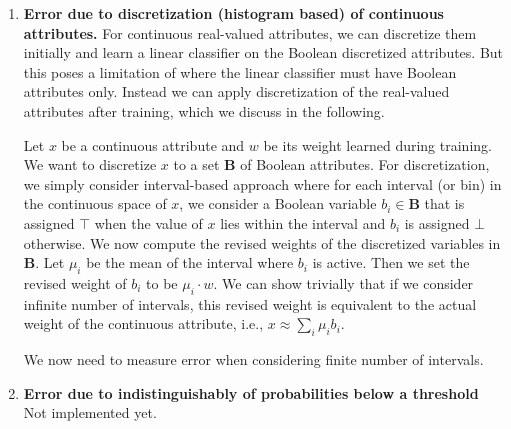\begin{enumerate}
	
	\item \textbf{Error due to discretization (histogram based) of continuous attributes.} For continuous real-valued attributes, we can discretize them initially and learn a linear classifier on the Boolean discretized attributes. But this poses a limitation of {\framework} where the linear classifier must have Boolean attributes only. Instead we can apply discretization of the real-valued attributes after training, which we discuss in the following.  
	
	Let $ x $ be a continuous attribute and $ w $ be its weight learned during training. We want to discretize $ x $ to a set $ \mathbf{B} $ of Boolean attributes. For discretization, we simply consider interval-based approach where for each interval (or bin) in the continuous space of $ x $, we consider a Boolean variable $ b_i \in \mathbf{B} $ that is assigned $ \top $ when the value of $ x $ lies within the interval and $ b_i $ is assigned $ \bot $ otherwise. We now compute the revised weights of the  discretized variables in $ \mathbf{B} $. Let $ \mu_i $ be the mean of the interval where  $ b_i $ is active. Then we set the revised weight of $ b_i $ to be $ \mu_i\cdot w $. We can show trivially that if we consider infinite number of intervals, this revised weight is equivalent to the actual weight of the continuous attribute, i.e., $ x \approx \sum_i \mu_ib_i $. 
	
	We now need to measure error when considering finite number of intervals. 
	
	
	\item \textbf{Error due to indistinguishably of probabilities below a threshold} Not implemented yet. 
\end{enumerate}



